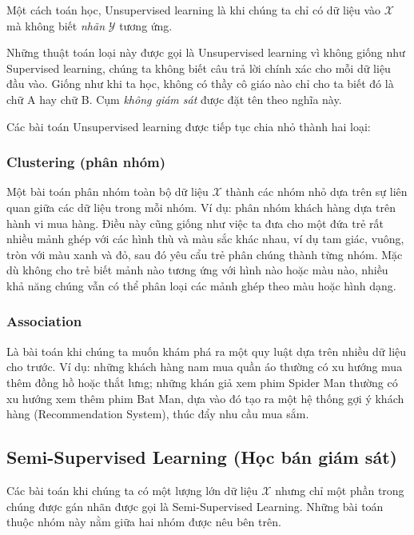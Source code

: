 Một cách toán học, Unsupervised learning là khi chúng ta chỉ có dữ liệu vào $\mathcal{X} $ mà không biết \textit{nhãn} $\mathcal{Y}$ tương ứng.  
 
Những thuật toán loại này được gọi là Unsupervised learning vì không giống như Supervised learning, chúng ta không biết câu trả lời chính xác cho mỗi dữ liệu đầu vào. Giống như khi ta học, không có thầy cô giáo nào chỉ cho ta biết đó là chữ A hay chữ B. Cụm \textit{không giám sát} được đặt tên theo nghĩa này.  
 
Các bài toán Unsupervised learning được tiếp tục chia nhỏ thành hai loại:  
 
\subsubsection{Clustering (phân nhóm)}
Một bài toán phân nhóm toàn bộ dữ liệu $\mathcal{X}$ thành các nhóm nhỏ dựa trên sự liên quan giữa các dữ liệu trong mỗi nhóm. Ví dụ: phân nhóm khách hàng dựa trên hành vi mua hàng. Điều này cũng giống như việc ta đưa cho một đứa trẻ rất nhiều mảnh ghép với các hình thù và màu sắc khác nhau, ví dụ tam giác, vuông, tròn với màu xanh và đỏ, sau đó yêu cẩu trẻ phân chúng thành từng nhóm. Mặc dù không cho trẻ biết mảnh nào tương ứng với hình nào hoặc màu nào, nhiều khả năng chúng vẫn có thể phân loại các mảnh ghép theo màu hoặc hình dạng.  
 
\subsubsection{Association}
Là bài toán khi chúng ta muốn khám phá ra một quy luật dựa trên nhiều dữ liệu cho trước. Ví dụ: những khách hàng nam mua quần áo thường có xu hướng mua thêm đồng hồ hoặc thắt lưng; những khán giả xem phim Spider Man thường có xu hướng xem thêm phim Bat Man, dựa vào đó tạo ra một hệ thống gợi ý khách hàng (Recommendation System), thúc đẩy nhu cầu mua sắm.  
 

\subsection{Semi-Supervised Learning (Học bán giám sát)}
Các bài toán khi chúng ta có một lượng lớn dữ liệu $\mathcal{X}$ nhưng chỉ một phần trong chúng được gán nhãn được gọi là Semi-Supervised Learning. Những bài toán thuộc nhóm này nằm giữa hai nhóm được nêu bên trên.  
 
